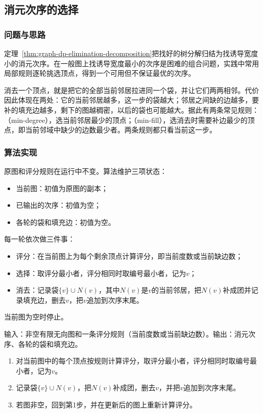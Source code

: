 \subsection{消元次序的选择}
\label{sec:graph-dp-order-heuristics}

\subsubsection{问题与思路}

定理~\ref{thm:graph-dp-elimination-decomposition}把找好的树分解归结为找诱导宽度小的消元次序。在一般图上找诱导宽度最小的次序是困难的组合问题，实践中常用局部规则逐轮挑选顶点，得到一个可用但不保证最优的次序。

消去一个顶点，就是把它的全部当前邻居拉进同一个袋，并让它们两两相邻。代价因此体现在两处：它的当前邻居越多，这一步的袋越大；邻居之间缺的边越多，要补的填充边越多，剩下的图越稠密，以后的袋也可能越大。据此有两条常见规则：（min-degree），选当前邻居最少的顶点；（min-fill），选消去时需要补边最少的顶点，即当前邻域中缺少的边数最少者。两条规则都只看当前这一步。

\subsubsection{算法实现}

原图和评分规则在运行中不变。算法维护三项状态：
\begin{itemize}
  \item 当前图：初值为原图的副本；
  \item 已输出的次序：初值为空；
  \item 各轮的袋和填充边：初值为空。
\end{itemize}
每一轮依次做三件事：
\begin{itemize}
  \item 评分：在当前图上为每个剩余顶点计算评分，即当前度数或当前缺边数；
  \item 选择：取评分最小者，评分相同时取编号最小者，记为$v$；
  \item 消去：记录袋$\{v\}\cup N(v)$，其中$N(v)$是$v$的当前邻居，把$N(v)$补成团并记录填充边，删去$v$，把$v$追加到次序末尾。
\end{itemize}
当前图为空时停止。

\begin{algorithm}[贪心选择消元次序]
\label{alg:graph-dp-greedy-order}
输入：非空有限无向图和一条评分规则（当前度数或当前缺边数）。输出：消元次序、各轮的袋和填充边。
\begin{enumerate}
  \item 对当前图中的每个顶点按规则计算评分，取评分最小者，评分相同时取编号最小者，记为$v$。
  \item 记录袋$\{v\}\cup N(v)$，把$N(v)$补成团，删去$v$，并把$v$追加到次序末尾。
  \item 若图非空，回到第1步，并在更新后的图上重新计算评分。
\end{enumerate}
\end{algorithm}

